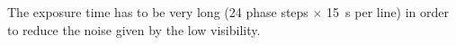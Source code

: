 \documentclass[a0,portrait]{a0poster}
\newenvironment{spacedcenter}{\vspace{2cm}\begin{center}}
        {\end{center}\vspace{2cm}\par}
\begin{document}
\begin{multicols}{2}
\begin{spacedcenter}
\end{spacedcenter}
The exposure time has to be very long (\num{24} phase steps $\times$
\SI{15}{\second} per line) in order to reduce the noise given by the low visibility.

\color{DarkSlateGray} %


\end{multicols}
\end{document}
